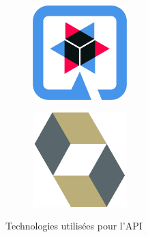 \begin{figure}[h]
	\centering
	\begin{subfigure}{.45\textwidth}
		\centering
		\includegraphics[width=0.40\textwidth]{assets/quarkus.png}
		\label{fig:quarkus}
	\end{subfigure}
	\begin{subfigure}{.45\textwidth}
		\centering
		\includegraphics[width=0.40\textwidth]{assets/hibernate.png}
		\label{fig:openid}
	\end{subfigure}
	\caption{Technologies utilisées pour l'API}
\end{figure}

